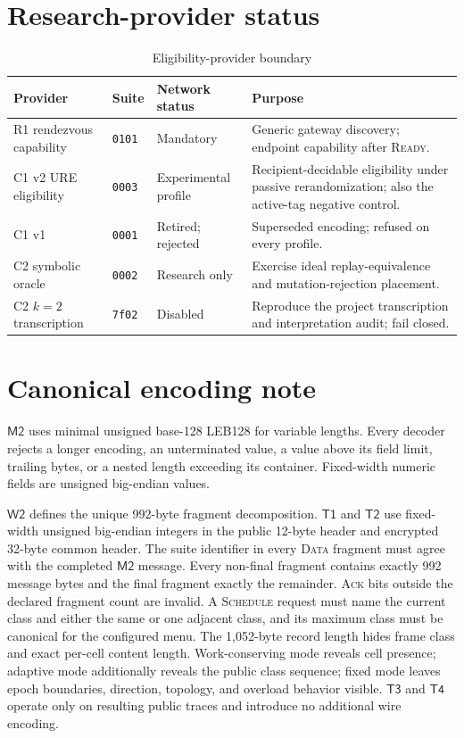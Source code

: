 \documentclass[11pt,oneside]{article}
\newcommand{\Mtwo}{\ensuremath{\mathsf{M2}}}
\newcommand{\Wtwo}{\ensuremath{\mathsf{W2}}}
\newcommand{\Tone}{\ensuremath{\mathsf{T1}}}
\newcommand{\Ttwo}{\ensuremath{\mathsf{T2}}}
\newcommand{\Tthree}{\ensuremath{\mathsf{T3}}}
\newcommand{\Tfour}{\ensuremath{\mathsf{T4}}}
\newcommand{\code}[1]{\texttt{#1}}
\begin{document}
\section{Research-provider status}
\label{app:providers}

\begin{table}[ht]
\centering
\caption{Eligibility-provider boundary}
\label{tab:providers}
\begin{tabularx}{\textwidth}{@{}p{}p{}p{}X@{}}
\toprule
Provider & Suite & Network status & Purpose \\
\midrule
R1 rendezvous capability & \code{0101} & Mandatory & Generic gateway discovery; endpoint capability after \textsc{Ready}. \\
C1 v2 URE eligibility & \code{0003} & Experimental profile & Recipient-decidable eligibility under passive rerandomization; also the active-tag negative control. \\
C1 v1 & \code{0001} & Retired; rejected & Superseded encoding; refused on every profile. \\
C2 symbolic oracle & \code{0002} & Research only & Exercise ideal replay-equivalence and mutation-rejection placement. \\
C2 $k=2$ transcription & \code{7f02} & Disabled & Reproduce the project transcription and interpretation audit; fail closed. \\
\bottomrule
\end{tabularx}
\end{table}

\section{Canonical encoding note}

\Mtwo{} uses minimal unsigned base-128 LEB128 for variable lengths. Every decoder rejects a longer encoding, an unterminated value, a value above its field limit, trailing bytes, or a nested length exceeding its container. Fixed-width numeric fields are unsigned big-endian values.

\Wtwo{} defines the unique 992-byte fragment decomposition. \Tone{} and \Ttwo{} use fixed-width unsigned big-endian integers in the public 12-byte header and encrypted 32-byte common header. The suite identifier in every \textsc{Data} fragment must agree with the completed \Mtwo{} message. Every non-final fragment contains exactly 992 message bytes and the final fragment exactly the remainder. \textsc{Ack} bits outside the declared fragment count are invalid. A \textsc{Schedule} request must name the current class and either the same or one adjacent class, and its maximum class must be canonical for the configured menu. The 1,052-byte record length hides frame class and exact per-cell content length. Work-conserving mode reveals cell presence; adaptive mode additionally reveals the public class sequence; fixed mode leaves epoch boundaries, direction, topology, and overload behavior visible. \Tthree{} and \Tfour{} operate only on resulting public traces and introduce no additional wire encoding.
\end{document}

